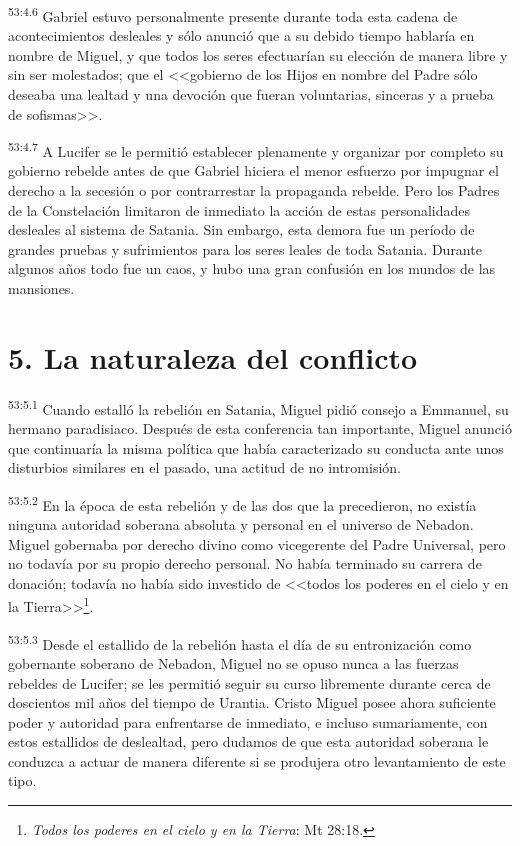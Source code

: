 \par
\textsuperscript{53:4.6} Gabriel estuvo personalmente presente durante toda esta cadena de acontecimientos desleales y sólo anunció que a su debido tiempo hablaría en nombre de Miguel, y que todos los seres efectuarían su elección de manera libre y sin ser molestados; que el <<gobierno de los Hijos en nombre del Padre sólo deseaba una lealtad y una devoción que fueran voluntarias, sinceras y a prueba de sofismas>>.

\par
\textsuperscript{53:4.7} A Lucifer se le permitió establecer plenamente y organizar por completo su gobierno rebelde antes de que Gabriel hiciera el menor esfuerzo por impugnar el derecho a la secesión o por contrarrestar la propaganda rebelde. Pero los Padres de la Constelación limitaron de inmediato la acción de estas personalidades desleales al sistema de Satania. Sin embargo, esta demora fue un período de grandes pruebas y sufrimientos para los seres leales de toda Satania. Durante algunos años todo fue un caos, y hubo una gran confusión en los mundos de las mansiones.

\section*{5. La naturaleza del conflicto}
\par
\textsuperscript{53:5.1} Cuando estalló la rebelión en Satania, Miguel pidió consejo a Emmanuel, su hermano paradisiaco. Después de esta conferencia tan importante, Miguel anunció que continuaría la misma política que había caracterizado su conducta ante unos disturbios similares en el pasado, una actitud de no intromisión.

\par
\textsuperscript{53:5.2} En la época de esta rebelión y de las dos que la precedieron, no existía ninguna autoridad soberana absoluta y personal en el universo de Nebadon. Miguel gobernaba por derecho divino como vicegerente del Padre Universal, pero no todavía por su propio derecho personal. No había terminado su carrera de donación; todavía no había sido investido de <<todos los poderes en el cielo y en la Tierra>>\footnote{\textit{Todos los poderes en el cielo y en la Tierra}: Mt 28:18.}.

\par
\textsuperscript{53:5.3} Desde el estallido de la rebelión hasta el día de su entronización como gobernante soberano de Nebadon, Miguel no se opuso nunca a las fuerzas rebeldes de Lucifer; se les permitió seguir su curso libremente durante cerca de doscientos mil años del tiempo de Urantia. Cristo Miguel posee ahora suficiente poder y autoridad para enfrentarse de inmediato, e incluso sumariamente, con estos estallidos de deslealtad, pero dudamos de que esta autoridad soberana le conduzca a actuar de manera diferente si se produjera otro levantamiento de este tipo.


